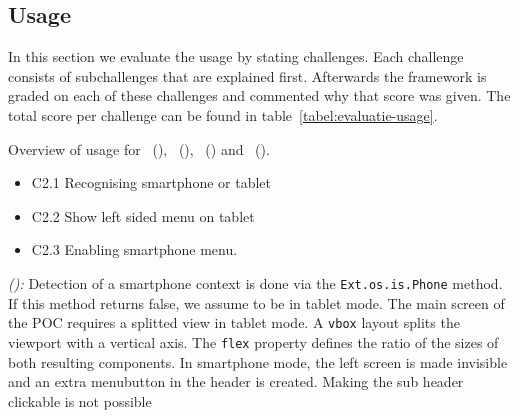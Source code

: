 \documentclass[a4paper]{artikel3}
\newcommand{\code}[1]{\texttt{#1}}
\newcommand{\setspace}[0]{\vspace{2mm}}
\renewcommand{\paragraph}[1]{\setspace \noindent {\bf #1}  }
\newcommand{\framework}[2]{ \emph{#1 (\textbf{#2}): }} %
\newcommand{\challenge}[1]{\paragraph{#1}}
\begin{document}

\subsection{Usage}
\label{sec:evaluation-usage}
In this section we evaluate the usage by stating challenges.
Each challenge consists of subchallenges that are explained first.
Afterwards the framework is graded on each of these challenges and commented why that score was given.
The total score per challenge can be found in table~\ref{tabel:evaluatie-usage}.

\begin{table}
\centering
\resizebox{8.5cm}{!} {
}
\caption{Overview of usage for \st{}~(\sta), \kendo{}~(\kendoa), \jqm{}~(\jqma) and \lungo{}~(\lungoa).}
\label{tabel:evaluatie-usage}
\end{table}


\challenge{\chal{toestel}}
\begin{itemize}
  \item C2.1 Recognising smartphone or tablet
  \item C2.2 Show left sided menu on tablet 
  \item C2.3 Enabling smartphone menu.
\end{itemize}

\framework{\sta}{}
Detection of a smartphone context is done via the \code{Ext.os.is.Phone} method.  
If this method returns false,  we assume to be in tablet mode.    
The main screen of the POC requires a splitted view in tablet mode.  
A \code{vbox} layout splits the viewport with a vertical axis.  
The \code{flex} property defines the ratio of the sizes of both resulting components. 
In smartphone mode,  the left screen is made invisible and an extra menubutton in the header is created.  
Making the sub header clickable is not possible  
\end{document}
